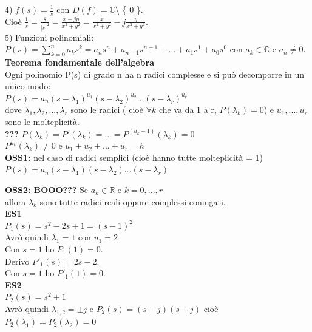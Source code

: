 4) $ f(s) = \frac{1}{s}$ con $ D(f) = \mathbb{C} \setminus$ \{ 0 \}.\\
Cioè $ \frac{1}{s} = \frac{ \bar{s} }{ |s|^{2}} = \frac{x-jy}{x^{2} + y^{2}} = \frac{ x }{ x^{2} + y^{2} } - j \frac{ y }{ x^{2} + y^{2} } $.\\

5) Funzioni polinomiali:\\
$ P(s) = \sum_{k=0}^n a_{k} s^{k} = a_{n} s^{n} + a_{n-1} s^{n-1} +...+a_{1} s^{1}+a_{0} s^{0} $ con $ a_{k} \in \mathbb{C} $ e $ a_{n} \neq 0$. \\

\textbf{Teorema fondamentale dell'algebra}\\
Ogni polinomio P(s) di grado n ha n radici complesse e si può decomporre in un unico modo:\\
$ P(s) = a_{n} (s- \lambda_{1})^{u_{1}} (s- \lambda_{2})^{u_{2}} ... (s- \lambda_{r})^{u_{r}} $ \\
dove $ \lambda_{1}, \lambda_{2},...,\lambda_{r} $ sono le radici ( cioè $ \forall k $ che va da 1 a r, $ P(\lambda_{k}) = 0$) e $ u_{1},...,u_{r} $ sono le molteplicità.\\

\textbf{???}%
$ P(\lambda_{k}) = P'(\lambda_{k}) = ... = P^{(u_{k}-1)}(\lambda_{k}) = 0 $ \\
$ P^{u_{k}}(\lambda_{k}) \neq 0 $ e $ u_{1}+u_{2}+...+u_{r} = h $\\

\textbf{OSS1:} nel caso di radici semplici (cioè hanno tutte molteplicità = 1)\\
$ P(s) = a_{n} (s- \lambda_{1}) (s- \lambda_{2}) ... (s- \lambda_{r}) $

\textbf{OSS2: BOOO???} Se $ a_{k} \in \mathbb{R}$ e $ k=0,...,r $ \\
allora $ \lambda_{k}$ sono tutte radici reali oppure complessi coniugati.\\

\textbf{ES1}\\
$ P_{1}(s) = s^{2} -2s +1 = (s-1)^{2}$\\
Avrò quindi $ \lambda_{1} = 1$ con $ u_{1} = 2$\\
Con $ s=1 $ ho $ P_{1}(1) = 0$.\\
Derivo $ P'_{1}(s) = 2s - 2$.\\
Con $ s=1 $ ho $ P'_{1}(1) = 0$.\\

\textbf{ES2}\\
$ P_{2}(s) = s^{2} +1$\\
Avrò quindi $ \lambda_{1,2} = \pm j$ e $ P_{2}(s) = (s-j)(s+j)$ cioè $ P_{2}( \lambda_{1})=P_{2}( \lambda_{2})=0$\\

